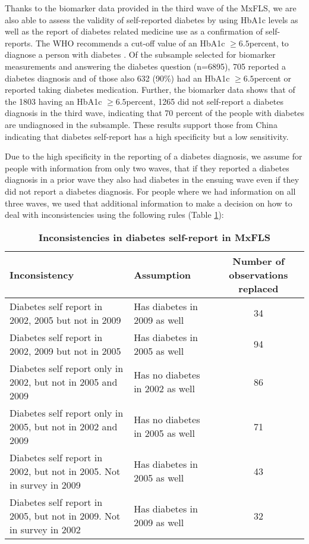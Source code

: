 Thanks to the biomarker data provided in the third wave of the \ac{MxFLS},
we are also able to assess the validity of self-reported diabetes
by using \ac{HbA1c} levels as well as the report of diabetes related
medicine use as a confirmation of self-reports. The \ac{WHO} recommends
a cut-off value of an \ac{HbA1c} $\geq6.5$percent, to diagnose
a person with diabetes \citep{WorldHealthOrganization2011}. Of the
subsample selected for biomarker measurements and answering the diabetes
question (n=6895), 705 reported a diabetes diagnosis and of those
also 632 (90\%) had an \ac{HbA1c} $\geq6.5$percent or reported
taking diabetes medication. Further, the biomarker data shows that
of the 1803 having an \ac{HbA1c} $\geq6.5$percent, 1265 did
not self-report a diabetes diagnosis in the third wave, indicating
that 70 percent of the people with diabetes are undiagnosed in the
subsample. These results support those from China indicating that
diabetes self-report has a high specificity but a low sensitivity.

Due to the high specificity in the reporting of a diabetes diagnosis,
we assume for people with information from only two waves, that if
they reported a diabetes diagnosis in a prior wave they also had diabetes
in the ensuing wave even if they did not report a diabetes diagnosis.
For people where we had information on all three waves, we used that
additional information to make a decision on how to deal with inconsistencies
using the following rules (Table \ref{tab:Inconsistencies}):
\providecommand{\tabularnewline}{\\}

\begin{table}[h!]
\begin{center}
\begin{tabular}{llc}
Inconsistency & Assumption & Number of observations replaced\tabularnewline
\hline 
Diabetes self report in 2002, 2005 but not in 2009 & Has diabetes in 2009 as well & 34\tabularnewline
Diabetes self report in 2002, 2009 but not in 2005 & Has diabetes in 2005 as well & 94\tabularnewline
Diabetes self report only in 2002, but not in 2005 and 2009 & Has no diabetes in 2002 as well & 86\tabularnewline
Diabetes self report only in 2005, but not in 2002 and 2009 & Has no diabetes in 2005 as well & 71\tabularnewline
Diabetes self report in 2002, but not in 2005. Not in survey in 2009 & Has diabetes in 2005 as well & 43\tabularnewline
Diabetes self report in 2005, but not in 2009. Not in survey in 2002 & Has diabetes in 2009 as well & 32\tabularnewline
\hline 
\end{tabular}
\end{center}
\caption{\label{tab:Inconsistencies}\textbf{Inconsistencies in diabetes self-report in MxFLS}}
\end{table}
  

